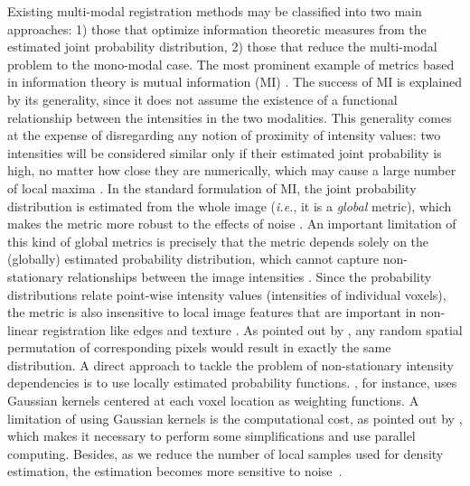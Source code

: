 Existing multi-modal registration methods may be classified into two main approaches: 1) those that optimize information theoretic measures from the estimated joint probability distribution, 2) those that reduce the multi-modal problem to the mono-modal case. The most prominent example of metrics based in information theory is mutual information (MI) \citep{Maes1997, Mattes2003}. The success of MI is explained by its generality, since it does not assume the existence of a functional relationship between the intensities in the two modalities. This generality comes at the expense of disregarding any notion of proximity of intensity values: two intensities will be considered similar only if their estimated joint probability is high, no matter how close they are numerically, which may cause a large number of local maxima \citep[see][Fig. 2]{Roche1998}. In the standard formulation of MI, the joint probability distribution is estimated from the whole image ({\it i.e.}, it is a {\it global} metric), which makes the metric more robust to the effects of noise \citep{Mattes2003}. An important limitation of this kind of global metrics is precisely that the metric depends solely on the (globally) estimated probability distribution, which cannot capture non-stationary relationships between the image intensities \citep{Hermosillo2004}. Since the probability distributions relate point-wise intensity values (intensities of individual voxels), the metric is also insensitive to local image features that are important in non-linear registration like edges and texture \citep{Heinrich2012}. As pointed out by \cite{Sotiras2013}, any random spatial permutation of corresponding pixels would result in exactly the same distribution. A direct approach to tackle the problem of non-stationary intensity dependencies is to use locally estimated probability functions. \cite{Hermosillo2004}, for instance, uses Gaussian kernels centered at each voxel location as weighting functions. A limitation of using Gaussian kernels is the computational cost, as pointed out by \cite{Hermosillo2004}, which makes it necessary to perform some simplifications and use parallel computing. Besides, as we reduce the number of local samples used for density estimation, the estimation becomes more sensitive to noise~\citep{Mattes2003}.\\

